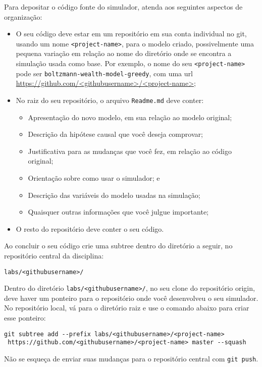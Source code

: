 Para depositar o código fonte do simulador, atenda aos seguintes aspectos de organização:
\begin{itemize}
    \item O seu código deve estar em um repositório em sua conta individual no git, usando um nome \verb|<project-name>|, para o modelo criado, possivelmente uma pequena variação em relação ao nome do diretório onde se encontra a simulação usada como base. Por exemplo, o nome do seu \verb|<project-name>| pode ser
    \verb|boltzmann-wealth-model-greedy|, com uma url \url{https://github.com/<githubusername>/<project-name>};
    \item No raiz do seu repositório, o arquivo \verb|Readme.md| deve conter:
    \begin{itemize}
        \item Apresentação do novo modelo, em sua relação ao modelo original;
        \item Descrição da hipótese causal que você deseja comprovar;
        \item Justificativa para as mudanças que você fez, em relação ao código original;
        \item Orientação sobre como usar o simulador; e
        \item Descrição das variáveis do modelo usadas na simulação;
        \item Quaisquer outras informações que você julgue importante;
    \end{itemize}
    \item O resto do repositório deve conter o seu código.
\end{itemize}

Ao concluir o seu código crie uma subtree dentro do diretório a seguir, no repositório central da disciplina:

\verb|labs/<githubusername>/|

Dentro do diretório \verb|labs/<githubusername>/|, no seu clone do repositório origin, deve haver um ponteiro para o repositório onde você desenvolveu o seu simulador. No repositório local, vá para o diretório raiz e use o comando abaixo para criar esse ponteiro:

{\footnotesize
\begin{verbatim}
git subtree add --prefix labs/<githubusername>/<project-name> 
 https://github.com/<githubusername>/<project-name> master --squash
\end{verbatim}
}

Não se esqueça de enviar suas mudanças para o repositório central com \verb|git push|.

